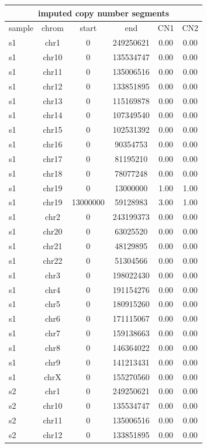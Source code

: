 \documentclass{standalone}
\begin{document}
\begin{tabular}{|l|c|c|c|c|c|}
\hline
\multicolumn{6}{|c|}{\textbf{imputed copy number segments}}\\
\hline 

sample & chrom & start & end & CN1 & CN2 \\
\hline
s1 & chr1 & 0 & 249250621 & 0.00 & 0.00 \\
s1 & chr10 & 0 & 135534747 & 0.00 & 0.00 \\
s1 & chr11 & 0 & 135006516 & 0.00 & 0.00 \\
s1 & chr12 & 0 & 133851895 & 0.00 & 0.00 \\
s1 & chr13 & 0 & 115169878 & 0.00 & 0.00 \\
s1 & chr14 & 0 & 107349540 & 0.00 & 0.00 \\
s1 & chr15 & 0 & 102531392 & 0.00 & 0.00 \\
s1 & chr16 & 0 & 90354753 & 0.00 & 0.00 \\
s1 & chr17 & 0 & 81195210 & 0.00 & 0.00 \\
s1 & chr18 & 0 & 78077248 & 0.00 & 0.00 \\
s1 & chr19 & 0 & 13000000 & 1.00 & 1.00 \\
s1 & chr19 & 13000000 & 59128983 & 3.00 & 1.00 \\
s1 & chr2 & 0 & 243199373 & 0.00 & 0.00 \\
s1 & chr20 & 0 & 63025520 & 0.00 & 0.00 \\
s1 & chr21 & 0 & 48129895 & 0.00 & 0.00 \\
s1 & chr22 & 0 & 51304566 & 0.00 & 0.00 \\
s1 & chr3 & 0 & 198022430 & 0.00 & 0.00 \\
s1 & chr4 & 0 & 191154276 & 0.00 & 0.00 \\
s1 & chr5 & 0 & 180915260 & 0.00 & 0.00 \\
s1 & chr6 & 0 & 171115067 & 0.00 & 0.00 \\
s1 & chr7 & 0 & 159138663 & 0.00 & 0.00 \\
s1 & chr8 & 0 & 146364022 & 0.00 & 0.00 \\
s1 & chr9 & 0 & 141213431 & 0.00 & 0.00 \\
s1 & chrX & 0 & 155270560 & 0.00 & 0.00 \\
s2 & chr1 & 0 & 249250621 & 0.00 & 0.00 \\
s2 & chr10 & 0 & 135534747 & 0.00 & 0.00 \\
s2 & chr11 & 0 & 135006516 & 0.00 & 0.00 \\
s2 & chr12 & 0 & 133851895 & 0.00 & 0.00 \\

\end{tabular}
\end{document}
